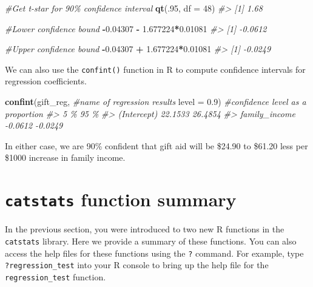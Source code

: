 \documentclass[
  10pt,
  openany]{book}
\newenvironment{Shaded}{\begin{snugshade}}{\end{snugshade}}
\newcommand{\AttributeTok}[1]{\textcolor[rgb]{0.13,0.29,0.53}{#1}}
\newcommand{\CommentTok}[1]{\textcolor[rgb]{0.56,0.35,0.01}{\textit{#1}}}
\newcommand{\DecValTok}[1]{\textcolor[rgb]{0.00,0.00,0.81}{#1}}
\newcommand{\FloatTok}[1]{\textcolor[rgb]{0.00,0.00,0.81}{#1}}
\newcommand{\FunctionTok}[1]{\textcolor[rgb]{0.13,0.29,0.53}{\textbf{#1}}}
\newcommand{\NormalTok}[1]{#1}
\newcommand{\SpecialCharTok}[1]{\textcolor[rgb]{0.81,0.36,0.00}{\textbf{#1}}}
\theoremstyle{definition}
\theoremstyle{definition}
\theoremstyle{definition}
\theoremstyle{definition}
\theoremstyle{remark}
\begin{document}
\begin{Shaded}
\begin{Highlighting}[]
\CommentTok{\#Get t{-}star for 90\% confidence interval}
\FunctionTok{qt}\NormalTok{(.}\DecValTok{95}\NormalTok{, }\AttributeTok{df =} \DecValTok{48}\NormalTok{)}
\CommentTok{\#\textgreater{} [1] 1.68}
\end{Highlighting}
\end{Shaded}

\begin{Shaded}
\begin{Highlighting}[]
\CommentTok{\#Lower confidence bound}
\SpecialCharTok{{-}}\FloatTok{0.04307} \SpecialCharTok{{-}} \FloatTok{1.677224}\SpecialCharTok{*}\FloatTok{0.01081}
\CommentTok{\#\textgreater{} [1] {-}0.0612}

\CommentTok{\#Upper confidence bound}
\SpecialCharTok{{-}}\FloatTok{0.04307} \SpecialCharTok{+} \FloatTok{1.677224}\SpecialCharTok{*}\FloatTok{0.01081}
\CommentTok{\#\textgreater{} [1] {-}0.0249}
\end{Highlighting}
\end{Shaded}

We can also use the \texttt{confint()} function in R to compute confidence intervals for regression coefficients.

\begin{Shaded}
\begin{Highlighting}[]
\FunctionTok{confint}\NormalTok{(gift\_reg,   }\CommentTok{\#name of regression results}
        \AttributeTok{level =} \FloatTok{0.9}\NormalTok{)  }\CommentTok{\#confidence level as a proportion}
\CommentTok{\#\textgreater{}                   5 \%    95 \%}
\CommentTok{\#\textgreater{} (Intercept)   22.1533 26.4854}
\CommentTok{\#\textgreater{} family\_income {-}0.0612 {-}0.0249}
\end{Highlighting}
\end{Shaded}

In either case, we are 90\% confident that gift aid will be \$24.90 to \$61.20 less per \$1000 increase in family income.

\section{\texorpdfstring{\texttt{catstats} function summary}{catstats function summary}}\label{catstats-function-summary-2}

In the previous section, you were introduced to two new R
functions in the \texttt{catstats} library. Here we provide a summary of
these functions. You can also access
the help files for these functions using the \texttt{?} command. For
example, type \texttt{?regression\_test} into your R console to bring up the
help file for the \texttt{regression\_test} function.
\end{document}

